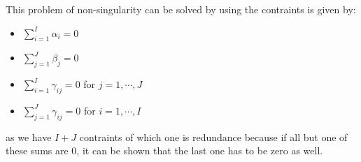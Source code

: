 \begin{remark}
    This problem of non-singularity can be solved by using the contraints is given by:
    \begin{itemize}
        \item $\sum^I_{i=1}\alpha_i=0$ 
        \item $\sum^J_{j=1}\beta_j=0$
        \item $\sum^I_{i=1}\gamma_{ij} = 0$ for $j=1,\cdots,J$
        \item $\sum^J_{j=1}\gamma_{ij} = 0$ for $i=1,\cdots,I$
    \end{itemize}
    as we have $I+J$ contraints of which one is redundance because if all but one of these sums are $0$, it can be shown that the last one has to be zero as well. 
\end{remark}

